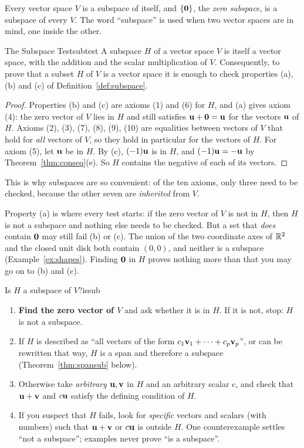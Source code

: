 \documentclass[11pt]{article}
\begin{document}
Every vector space $V$ is a subspace of itself, and $\{\mathbf{0}\}$, the \emph{zero subspace}, is a subspace of every $V$. The word ``subspace'' is used when two vector spaces are in mind, one inside the other.

\begin{thm}{The Subspace Test}{subtest}
A subspace $H$ of a vector space $V$ is itself a vector space, with the addition and the scalar multiplication of $V$. Consequently, to prove that a subset $H$ of $V$ is a vector space it is enough to check properties (a), (b) and (c) of Definition~\ref{def:subspace}.
\end{thm}

\begin{proof}
Properties (b) and (c) are axioms (1) and (6) for $H$, and (a) gives axiom (4): the zero vector of $V$ lies in $H$ and still satisfies $\mathbf{u}+\mathbf{0}=\mathbf{u}$ for the vectors $\mathbf{u}$ of $H$. Axioms (2), (3), (7), (8), (9), (10) are equalities between vectors of $V$ that hold for \emph{all} vectors of $V$, so they hold in particular for the vectors of $H$. For axiom (5), let $\mathbf{u}$ be in $H$. By (c), $(-1)\mathbf{u}$ is in $H$, and $(-1)\mathbf{u}=-\mathbf{u}$ by Theorem~\ref{thm:conseq}(e). So $H$ contains the negative of each of its vectors.
\end{proof}

This is why subspaces are so convenient: of the ten axioms, only three need to be checked, because the other seven are \emph{inherited} from $V$.

\begin{warn}
Property (a) is where every test starts: if the zero vector of $V$ is not in $H$, then $H$ is not a subspace and nothing else needs to be checked. But a set that \emph{does} contain $\mathbf{0}$ may still fail (b) or (c). The union of the two coordinate axes of $\mathbb{R}^2$ and the closed unit disk both contain $(0,0)$, and neither is a subspace (Example~\ref{ex:shapes}). Finding $\mathbf{0}$ in $H$ proves nothing more than that you may go on to (b) and (c).
\end{warn}

\begin{proc}{Is $H$ a subspace of $V$?}{issub}
\begin{enumerate}
  \item \textbf{Find the zero vector of $V$} and ask whether it is in $H$. If it is not, stop: $H$ is not a subspace.
  \item If $H$ is described as ``all vectors of the form $c_1\mathbf{v}_1+\cdots+c_p\mathbf{v}_p$'', or can be rewritten that way, $H$ is a span and therefore a subspace (Theorem~\ref{thm:spansub} below).
  \item Otherwise take \emph{arbitrary} $\mathbf{u},\mathbf{v}$ in $H$ and an arbitrary scalar $c$, and check that $\mathbf{u}+\mathbf{v}$ and $c\mathbf{u}$ satisfy the defining condition of $H$.
  \item If you suspect that $H$ fails, look for \emph{specific} vectors and scalars (with numbers) such that $\mathbf{u}+\mathbf{v}$ or $c\mathbf{u}$ is outside $H$. One counterexample settles ``not a subspace''; examples never prove ``is a subspace''.
\end{enumerate}
\end{proc}
\end{document}
